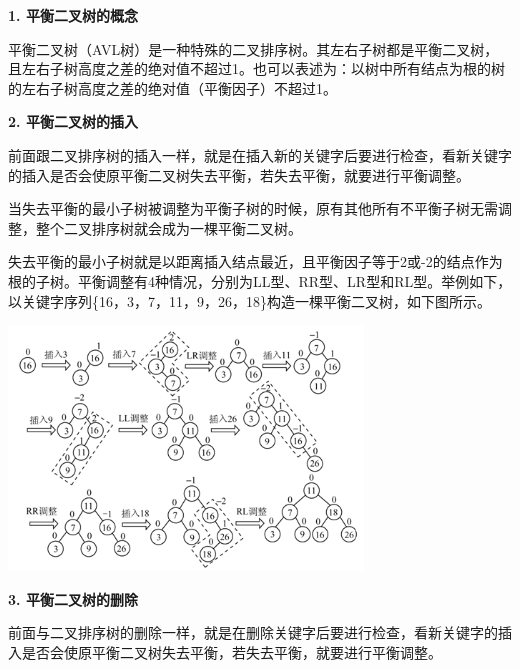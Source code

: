 {\textbf{1. 平衡二叉树的概念}}

{平衡二叉树（AVL树）是一种特殊的二叉排序树。{其左右子树都是平衡二叉树，且左右子树高度之差的绝对值不超过1}。也可以表述为：以树中所有结点为根的树的左右子树高度之差的绝对值（平衡因子）不超过1。}

{\textbf{2. 平衡二叉树的插入}}

{前面跟二叉排序树的插入一样，就是在插入新的关键字后要进行检查，看新关键字的插入是否会使原平衡二叉树失去平衡，若失去平衡，就要进行平衡调整。}

{当失去平衡的最小子树被调整为平衡子树的时候，原有其他所有不平衡子树无需调整，整个二叉排序树就会成为一棵平衡二叉树。}

失去平衡的最小子树就是以距离插入结点最近，且平衡因子等于2或-2的结点作为根的子树。平衡调整有4种情况，分别为LL型、RR型、LR型和RL型。举例如下，以关键字序列\{16，3，7，11，9，26，18\}构造一棵平衡二叉树，如下图所示。

\includegraphics[width=3.70833in,height=2.56250in]{png-jpeg-pics/38C3C4968C61359952421C25368E97F4.png}

{\textbf{3. 平衡二叉树的删除}}

{前面与二叉排序树的删除一样，就是在删除关键字后要进行检查，看新关键字的插入是否会使原平衡二叉树失去平衡，若失去平衡，就要进行平衡调整。}

